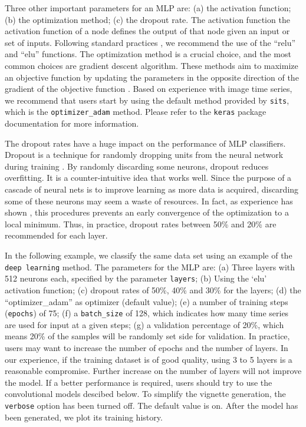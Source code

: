 \documentclass[a4paper,]{tufte-book}
\begin{document}
Three other important parameters for an MLP are: (a) the activation function; (b) the optimization method; (c) the dropout rate. The activation function the activation function of a node defines the output of that node given an input or set of inputs. Following standard practices \citep{Goodfellow2016}, we recommend the use of the ``relu'' and ``elu'' functions. The optimization method is a crucial choice, and the most common choices are gradient descent algorithm. These methods aim to maximize an objective function by updating the parameters in the opposite direction of the gradient of the objective function \citep{Ruder2016}. Based on experience with image time series, we recommend that users start by using the default method provided by \texttt{sits}, which is the \texttt{optimizer\_adam} method. Please refer to the \texttt{keras} package documentation for more information.

The dropout rates have a huge impact on the performance of MLP classifiers. Dropout is a technique for randomly dropping units from the neural network during training \citep{Srivastava2014}. By randomly discarding some neurons, dropout reduces overfitting. It is a counter-intuitive idea that works well. Since the purpose of a cascade of neural nets is to improve learning as more data is acquired, discarding some of these neurons may seem a waste of resources. In fact, as experience has shown \citep{Goodfellow2016}, this procedures prevents an early convergence of the optimization to a local minimum. Thus, in practice, dropout rates between 50\% and 20\% are recommended for each layer.

In the following example, we classify the same data set using an example of the \texttt{deep\ learning} method. The parameters for the MLP are: (a) Three layers with 512 neurons each, specified by the parameter \texttt{layers}; (b) Using the `elu' activation function; (c) dropout rates of 50\%, 40\% and 30\% for the layers; (d) the ``optimizer\_adam'' as optimizer (default value); (e) a number of training steps (\texttt{epochs}) of 75; (f) a \texttt{batch\_size} of 128, which indicates how many time series are used for input at a given steps; (g) a validation percentage of 20\%, which means 20\% of the samples will be randomly set side for validation. In practice, users may want to increase the number of epochs and the number of layers. In our experience, if the training dataset is of good quality, using 3 to 5 layers is a reasonable compromise. Further increase on the number of layers will not improve the model. If a better performance is required, users should try to use the convolutional models descibed below. To simplify the vignette generation, the \texttt{verbose} option has been turned off. The default value is on. After the model has been generated, we plot its training history.
\end{document}
